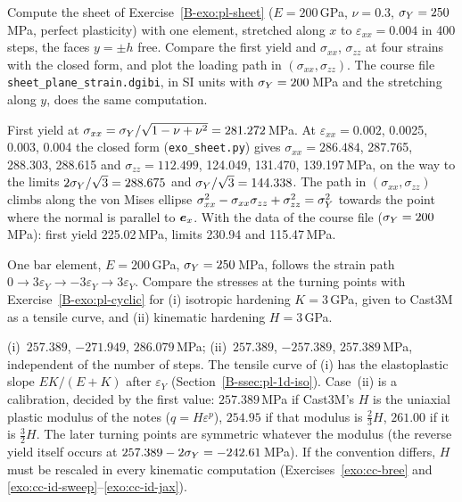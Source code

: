 \label{exo:cc-sheet}
%
Compute the sheet of Exercise~\ref{B-exo:pl-sheet} ($E=200$\,GPa, $\nu=0.3$,
$\sigma_{Y}=250$\,MPa, perfect plasticity) with one element, stretched along $x$ to
$\varepsilon_{xx}=0.004$ in 400 steps, the faces $y=\pm h$ free. Compare the
first yield and $\sigma_{xx}$, $\sigma_{zz}$ at four strains with the closed
form, and plot the loading path in $(\sigma_{xx},\sigma_{zz})$. The course file
\texttt{sheet\_plane\_strain.dgibi}, in SI units with $\sigma_{Y}=200$\,MPa and the
stretching along $y$, does the same computation.
\begin{solution}
First yield at $\sigma_{xx}=\sigma_{Y}/\sqrt{1-\nu+\nu^2}=281.272$\,MPa. At
$\varepsilon_{xx}=0.002$, 0.0025, 0.003, 0.004 the closed form
(\texttt{exo\_sheet.py}) gives $\sigma_{xx}=286.484$, 287.765, 288.303,
288.615 and $\sigma_{zz}=112.499$, 124.049, 131.470, 139.197\,MPa, on the way
to the limits $2\sigma_{Y}/\sqrt3=288.675$ and $\sigma_{Y}/\sqrt3=144.338$. The path in
$(\sigma_{xx},\sigma_{zz})$ climbs along the von Mises ellipse
$\sigma_{xx}^2-\sigma_{xx}\sigma_{zz}+\sigma_{zz}^2=\sigma_{Y}^2$ towards the point
where the normal is parallel to $\bm{e}_x$. With the data of the course file
($\sigma_{Y}=200$\,MPa): first yield 225.02\,MPa, limits 230.94 and 115.47\,MPa.

\end{solution}

\label{exo:cc-filament}
%
One bar element, $E=200$\,GPa, $\sigma_{Y}=250$\,MPa, follows the strain path
$0\to3\varepsilon_Y\to-3\varepsilon_Y\to3\varepsilon_Y$. Compare the stresses at
the turning points with Exercise~\ref{B-exo:pl-cyclic} for (i) isotropic
hardening $K=3$\,GPa, given to Cast3M as a tensile curve, and (ii) kinematic
hardening $H=3$\,GPa.
\begin{solution}
(i)~$257.389$, $-271.949$, $286.079$\,MPa; (ii)~$257.389$, $-257.389$,
$257.389$\,MPa, independent of the number of steps. The tensile curve of (i)
has the elastoplastic slope $EK/(E+K)$ after $\varepsilon_Y$
(Section~\ref{B-ssec:pl-1d-iso}). Case~(ii) is a calibration, decided by
the first value: $257.389$\,MPa if Cast3M's $H$ is the uniaxial plastic
modulus of the notes ($q=H\varepsilon^p$), $254.95$ if that modulus is
$\tfrac23H$, $261.00$ if it is $\tfrac32H$. The later turning points are
symmetric whatever the modulus (the reverse yield itself occurs at
$257.389-2\sigma_{Y}=-242.61$\,MPa). If the convention differs, $H$ must be rescaled
in every kinematic computation (Exercises~\ref{exo:cc-bree} and \ref{exo:cc-id-sweep}--\ref{exo:cc-id-jax}).

\end{solution}


